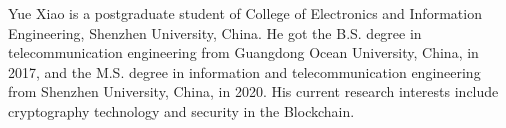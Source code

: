 \documentclass[journal]{IEEEtran}
\begin{document}
%

\ifCLASSOPTIONcaptionsoff
  \newpage
\fi







%
%


%
\begin{IEEEbiography}{Yue Xiao}
is a postgraduate student of College of Electronics and Information Engineering, Shenzhen University, China. He got the B.S. degree in telecommunication engineering from Guangdong Ocean University, China, in 2017, and the M.S. degree in information and telecommunication engineering from Shenzhen University, China, in 2020. His current research interests include cryptography technology and security in the Blockchain.
\end{IEEEbiography}
\end{document}
